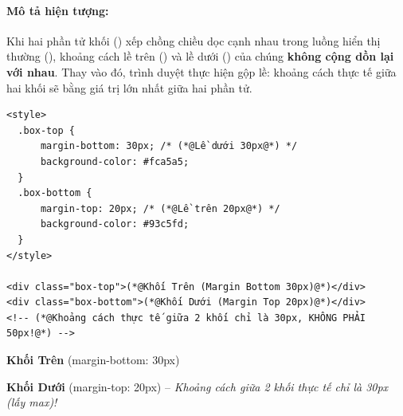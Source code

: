 \paragraph{Mô tả hiện tượng:}
Khi hai phần tử khối () xếp chồng chiều dọc cạnh nhau trong luồng hiển thị thường (), khoảng cách lề trên () và lề dưới () của chúng \textbf{không cộng dồn lại với nhau}. Thay vào đó, trình duyệt thực hiện gộp lề: khoảng cách thực tế giữa hai khối sẽ bằng giá trị  lớn nhất giữa hai phần tử.

\begin{codeWindow}
\begin{lstlisting}[language=HTML5]
<style>
  .box-top {
      margin-bottom: 30px; /* (*@Lề dưới 30px@*) */
      background-color: #fca5a5;
  }
  .box-bottom {
      margin-top: 20px; /* (*@Lề trên 20px@*) */
      background-color: #93c5fd;
  }
</style>

<div class="box-top">(*@Khối Trên (Margin Bottom 30px)@*)</div>
<div class="box-bottom">(*@Khối Dưới (Margin Top 20px)@*)</div>
<!-- (*@Khoảng cách thực tế giữa 2 khối chỉ là 30px, KHÔNG PHẢI 50px!@*) -->
\end{lstlisting}
\end{codeWindow}

\begin{browserWindow}[Minh Họa Hiện Tượng Gộp Lề (Khoảng Cách Giữa 2 Khối = 30px Khỏi Bị Cộng Dồn)]
\begin{tcolorbox}[enhanced, colback=red!15, colframe=red!40, arc=4pt, boxrule=0.6pt, top=4pt, bottom=4pt, left=8pt, right=8pt]
\sffamily\small\textbf{Khối Trên} (margin-bottom: 30px)
\end{tcolorbox}
\par\vspace{12pt} %
\begin{tcolorbox}[enhanced, colback=blue!15, colframe=blue!40, arc=4pt, boxrule=0.6pt, top=4pt, bottom=4pt, left=8pt, right=8pt]
\sffamily\small\textbf{Khối Dưới} (margin-top: 20px) -- \textit{Khoảng cách giữa 2 khối thực tế chỉ là 30px (lấy max)!}
\end{tcolorbox}
\end{browserWindow}

